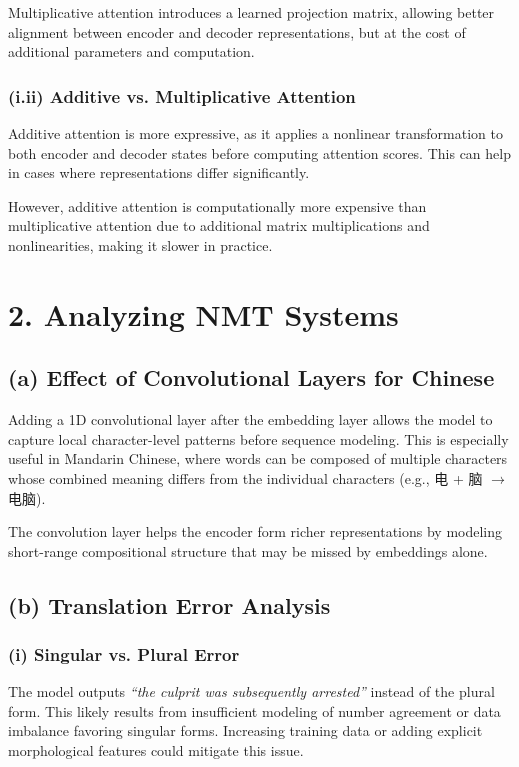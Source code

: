 \documentclass[11pt]{article}
\begin{document}
Multiplicative attention introduces a learned projection matrix, allowing better alignment between encoder and decoder representations, but at the cost of additional parameters and computation.

\subsubsection*{(i.ii) Additive vs. Multiplicative Attention}

Additive attention is more expressive, as it applies a nonlinear transformation to both encoder and decoder states before computing attention scores. This can help in cases where representations differ significantly.

However, additive attention is computationally more expensive than multiplicative attention due to additional matrix multiplications and nonlinearities, making it slower in practice.

\section*{2. Analyzing NMT Systems}

\subsection*{(a) Effect of Convolutional Layers for Chinese}

Adding a 1D convolutional layer after the embedding layer allows the model to capture local character-level patterns before sequence modeling. This is especially useful in Mandarin Chinese, where words can be composed of multiple characters whose combined meaning differs from the individual characters (e.g., 电 + 脑 $\rightarrow$ 电脑).

The convolution layer helps the encoder form richer representations by modeling short-range compositional structure that may be missed by embeddings alone.

\subsection*{(b) Translation Error Analysis}

\subsubsection*{(i) Singular vs. Plural Error}

The model outputs \textit{“the culprit was subsequently arrested”} instead of the plural form. This likely results from insufficient modeling of number agreement or data imbalance favoring singular forms. Increasing training data or adding explicit morphological features could mitigate this issue.
\end{document}
